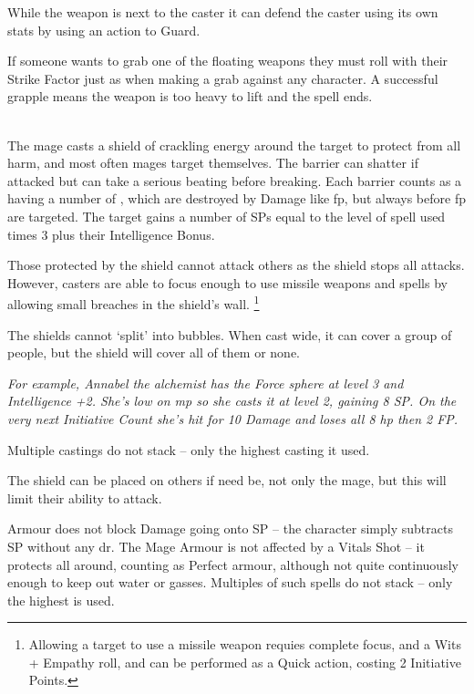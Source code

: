 \begin{multicols}{2}
While the weapon is next to the caster it can defend the caster using its own stats by using an action to Guard.

If someone wants to grab one of the floating weapons they must roll with their Strike Factor just as when making a grab against any character.
A successful grapple means the weapon is too heavy to lift and the spell ends.

\\
The mage casts a shield of crackling energy around the target to protect from all harm, and most often mages target themselves.
The barrier can shatter if attacked but can take a serious beating before breaking.
Each barrier counts as a having a number of , which are destroyed by Damage like \gls{fp}, but always before \gls{fp} are targeted.
The target gains a number of \glspl{SP} equal to the level of spell used times 3 plus their Intelligence Bonus.

Those protected by the shield cannot attack others as the shield stops all attacks.
However, casters are able to focus enough to use missile weapons and spells by allowing small breaches in the shield's wall.
\footnote{Allowing a target to use a missile weapon requies complete focus, and a Wits + Empathy roll, and can be performed as a Quick action, costing 2 Initiative Points.}

The shields cannot `split' into bubbles.
When cast wide, it can cover a group of people, but the shield will cover all of them or none.

\textit{For example, Annabel the alchemist has the Force sphere at level 3 and Intelligence +2.
She's low on \gls{mp} so she casts it at level 2, gaining 8 \gls{SP}.
On the very next Initiative Count she's hit for 10 Damage and loses all 8 \gls{hp} then 2 FP.}

Multiple castings do not stack -- only the highest casting it used.

The shield can be placed on others if need be, not only the mage, but this will limit their ability to attack.

Armour does not block Damage going onto \gls{SP} -- the character simply subtracts \gls{SP} without any \gls{dr}. The Mage Armour is not affected by a Vitals Shot -- it protects all around, counting as Perfect armour, although not quite continuously enough to keep out water or gasses. Multiples of such spells do not stack -- only the highest is used.


\end{multicols}

